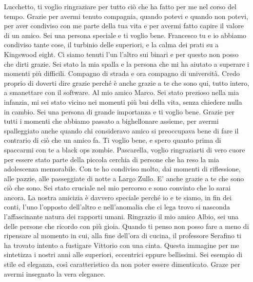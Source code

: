 \newline\newline
Lucchetto, ti voglio ringraziare per tutto ciò che ha fatto per me nel corso del tempo.  Grazie per avermi tenuto compagnia, quando potevi e quando non potevi, per aver condiviso con me parte della tua vita e per avermi fatto capire il valore di un amico. Sei una persona speciale e ti voglio bene.
\newline\newline
Francesco tu e io abbiamo condiviso tante cose, il turbinio delle superiori, e la calma dei prati su a Kingswood eight. Ci siamo tenuti l'un l'altro sui binari e per questo non posso che dirti grazie. Sei stato la mia spalla e la persona che mi ha aiutato a superare i momenti più difficili. Compagno di strada e ora compagno di università. Credo proprio di doverti dire grazie perché è anche grazie a te che sono qui, tutto intero, a smanettare con il software.
\newline\newline
Al mio amico Marco. Sei stato prezioso nella mia infanzia, mi sei stato vicino nei momenti più bui della vita, senza chiedere nulla in cambio. Sei una persona di grande importanza e ti voglio bene. Grazie per tutti i momenti che abbiamo passato a bighellonare assieme, per avermi spalleggiato anche quando chi consideravo amico si preoccupava bene di fare il contrario di ciò che un amico fa. Ti voglio bene, e spero quanto prima di spaccarmi con te a black ops zombie.
\newline\newline
Pascarella, voglio ringraziarti di vero cuore per essere stato parte della piccola cerchia di persone che ha reso la mia adolescenza memorabile. Con te ho condiviso molto, dai momenti di riflessione, alle pazzie, alle passeggiate di notte a Largo Zullo. E' anche grazie a te che sono ciò che sono. Sei stato cruciale nel mio percorso e sono convinto che lo sarai ancora. La nostra amicizia è davvero speciale perché io e te siamo, in fin dei conti, l'uno l'opposto dell'altro e nell'anomalia che ci lega trovo si nasconda l'affascinante natura dei rapporti umani.
\newline\newline
Ringrazio il mio amico Albio, sei una delle persone che ricordo con più gioia. Quando ti penso non posso fare a meno di ripensare al momento in cui, alla fine dell'ora di cucina, il professore Serafino ti ha trovato intento a fustigare Vittorio con una cinta. Questa immagine per me sintetizza i nostri anni alle superiori, eccentrici eppure bellissimi. Sei esempio di stile ed eleganza, così caratteristico da non poter essere dimenticato. Graze per avermi insegnato la vera elegance.
